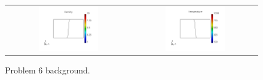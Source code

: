 \documentclass[review]{elsarticle}
\begin{document}
\begin{figure}[tbh]
  \begin{center}
    \begin{tabular}{cc}
      \includegraphics[width=0.5\textwidth]{figs/density_p61D.png} &
      \includegraphics[width=0.5\textwidth]{figs/temperature_p61D.png}
    \end{tabular}
  \caption{
    Problem 6 background.
  }
  \end{center}
  \label{fig:p51D_rho_T}
\end{figure}
\end{document}
